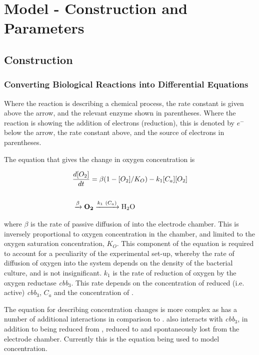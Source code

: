 \chapter{Model - Construction and Parameters}
\section{Construction}
\subsection{Converting Biological Reactions into Differential Equations}
Where the reaction is describing a chemical process, the rate constant is given above the arrow, and the relevant enzyme shown in parentheses. Where the reaction is showing the addition of electrons (reduction), this is denoted by $e^-$ below the arrow, the rate constant above, and the source of electrons in parentheses.

The equation that gives the change in oxygen concentration is

\begin{eqnarray}
&\frac{d[O_2]}{dt} = \beta(1-[O_2]/K_O) - k_{1}[C_a][O_2] \nonumber \\\nonumber \\
&\xrightarrow{\beta} \bold{O_2} \xrightarrow{k_1~(C_a)} \textnormal{H$_\textnormal{2}$O}
\label{eq:oxygen}
\end{eqnarray}

where $\beta$ is the rate of passive diffusion of \cOxygen \space into the electrode chamber. This is inversely proportional to oxygen concentration in the chamber, and limited to the oxygen saturation concentration, $K_O$. This component of the equation is required to account for a peculiarity of the experimental set-up, whereby the rate of diffusion of oxygen into the system depends on the density of the bacterial culture, and is not insignificant. $k_{1}$ is the rate of reduction of oxygen by the oxygen reductase \textit{cbb$_{\textrm{3}}$}. This rate depends on the concentration of reduced (i.e. active) \textit{cbb$_{\textrm{3}}$}, $C_a$ and the concentration of \cOxygen.

The equation for describing \cNO \space concentration changes is more complex as \cNO \space has a number of additional interactions in comparison to \cOxygen. \cNO \space also interacts with \textit{cbb$_{\textrm{3}}$}, in addition to being reduced from \cNitrite, reduced to \cNtwoO \space and spontaneously lost from the electrode chamber. Currently this is the equation being used to model \cNO \space concentration.

